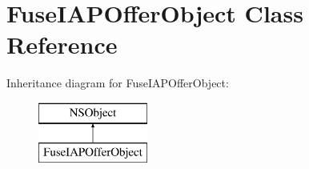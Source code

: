 \hypertarget{interface_fuse_i_a_p_offer_object}{}\section{Fuse\+I\+A\+P\+Offer\+Object Class Reference}
\label{interface_fuse_i_a_p_offer_object}
Inheritance diagram for Fuse\+I\+A\+P\+Offer\+Object\+:\begin{figure}[H]
\begin{center}
\leavevmode
\includegraphics[height=2.000000cm]{interface_fuse_i_a_p_offer_object}
\end{center}
\end{figure}
